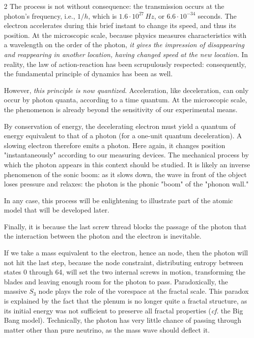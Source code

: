\begin{multicols}{2}
	The process is not without consequence: the transmission occurs at the photon's frequency, i.e., $1/h$, which is $1.6 \cdot 10^{27}\,Hz$, or $6.6 \cdot 10^{-34}$ seconds. The electron accelerates during this brief instant to change its speed, and thus its position. At the microscopic scale, because physics measures characteristics with a wavelength on the order of the photon, \textit{it gives the impression of disappearing and reappearing in another location, having changed speed at the new location.} In reality, the law of action-reaction has been scrupulously respected: consequently, the fundamental principle of dynamics has been as well.
	
	However, \textit{this principle is now quantized}. Acceleration, like deceleration, can only occur by photon quanta, according to a time quantum. At the microscopic scale, the phenomenon is already beyond the sensitivity of our experimental means.
	
	By conservation of energy, the decelerating electron must yield a quantum of energy equivalent to that of a photon (for a one-unit quantum deceleration). A slowing electron therefore emits a photon. Here again, it changes position "instantaneously" according to our measuring devices. The mechanical process by which the photon appears in this context should be studied. It is likely an inverse phenomenon of the sonic boom: as it slows down, the wave in front of the object loses pressure and relaxes: the photon is the phonic "boom" of the "phonon wall."
	
	In any case, this process will be enlightening to illustrate part of the atomic model that will be developed later.
	
	Finally, it is because the last screw thread blocks the passage of the photon that the interaction between the photon and the electron is inevitable.
	
	If we take a mass equivalent to the electron, hence an  node, then the photon will not hit the last step, because the node constraint, distributing entropy between states 0 through 64, will set the two internal screws in motion, transforming the blades and leaving enough room for the photon to pass. Paradoxically, the massive $S_3$ node plays the role of the vorespace at the fractal scale. This paradox is explained by the fact that the plenum is no longer quite a fractal structure, as its initial energy was not sufficient to preserve all fractal properties (\textit{cf.} the Big Bang model). Technically, the photon has very little chance of passing through matter other than pure neutrino, as the mass wave should deflect it.
	

\end{multicols}
